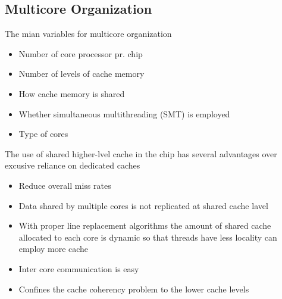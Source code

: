 \documentclass[12pt, a4paper]{article}
\begin{document}
		\subsection{Multicore Organization}
			The mian variables for multicore organization
			\begin{itemize}
				\item Number of core processor pr. chip
				\item Number of levels of cache memory
				\item How cache memory is shared
				\item Whether simultaneous multithreading (SMT) is employed
				\item Type of cores
			\end{itemize}
			The use of shared higher-lvel cache in the chip has several advantages over excusive reliance on dedicated caches
			\begin{itemize}
				\item Reduce overall miss rates
				\item Data shared by multiple cores is not replicated at shared cache lavel
				\item With proper line replacement algorithms the amount of shared cache allocated to each core is dynamic so that threads have less locality can employ more cache
				\item Inter core communication is easy
				\item Confines the cache coherency problem to the lower cache levels
			\end{itemize}
\end{document}
